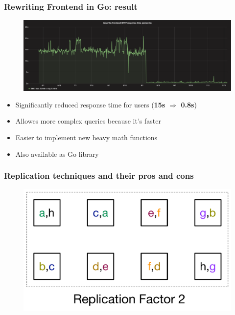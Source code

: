 \documentclass[aspectratio=43, unicode, notheorems, xcolor={dvipsnames}]{beamer}
\newcommand{\bs}[1]{\textbf{\textcolor{BookingBlue}{#1}}}
\begin{document}
\begin{frame}
	\frametitle{Rewriting Frontend in Go: result}
	\begin{figure}[h]
		\begin{center}
			\includegraphics[width=0.9\columnwidth]{graphite-carbonapi-performance}
		\end{center}
	\end{figure}
	\Large{
	\begin{itemize}
		\item Significantly reduced response time for users (\bs{15s $\Rightarrow$ 0.8s})
		\item Allowes more complex queries because it's faster
		\item Easier to implement new heavy math functions
		\item Also available as Go library
	\end{itemize}
	}
\end{frame}


\begin{frame}
	\frametitle{Replication techniques and their pros and cons}
	\begin{figure}[h]
		\begin{center}
			\includegraphics[height=0.7\paperheight]{rf2}
		\end{center}
	\end{figure}
\end{frame}
\end{document}
